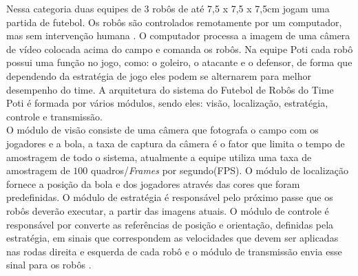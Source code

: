 Nessa categoria duas equipes de 3 robôs de até 7,5 x 7,5 x 7,5cm jogam uma partida de futebol. Os robôs são controlados remotamente por um computador, mas sem intervenção humana \cite{VSSS}. O computador processa a imagem de uma câmera de vídeo colocada acima do campo e comanda os robôs. Na equipe Poti cada robô possui uma função no jogo, como: o goleiro, o atacante e o defensor, de forma que dependendo da estratégia de jogo eles podem se alternarem para melhor desempenho do time. A arquitetura do sistema do Futebol de Robôs do Time Poti é formada por vários módulos, sendo eles: visão, localização, estratégia, controle e transmissão.\\

O módulo de visão consiste de uma câmera que fotografa o campo com os jogadores e a bola, a taxa de captura da câmera é o fator que limita o tempo de amostragem de todo o sistema, atualmente a equipe utiliza uma taxa de amostragem de $100$ quadros/\emph{Frames} por segundo(FPS). O módulo de localização fornece a posição da bola e dos jogadores através das cores que foram predefinidas. O módulo de estratégia é responsável pelo próximo passe que os robôs deverão executar, a partir das imagens atuais. O módulo de controle é responsável por converte as referências de posição e orientação, definidas pela estratégia, em sinais que correspondem as velocidades que devem ser aplicadas nas rodas direita e esquerda de cada robô e o módulo de transmissão envia esse sinal para os robôs \cite{POTI}.\\



